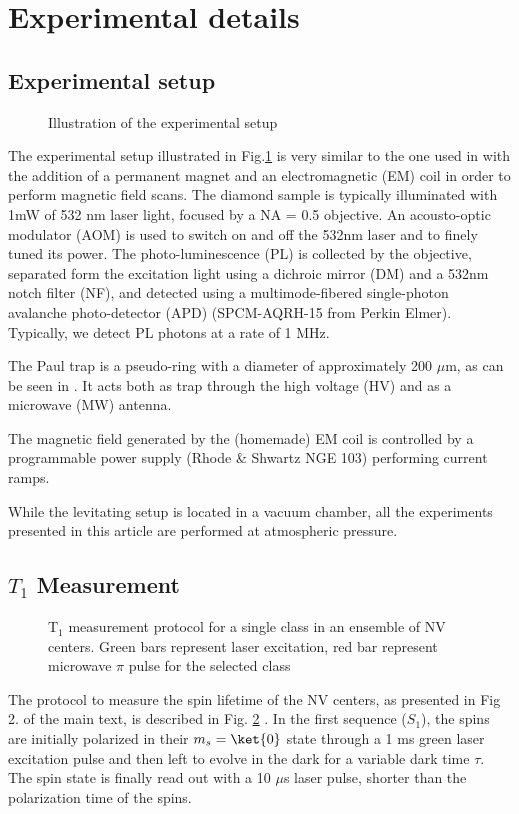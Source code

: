 \documentclass[preprintnumbers,amsmath,amssymb,onecolumn,12pt]{revtex4}
\begin{document}
\section{Experimental details}

\subsection{Experimental setup}

\begin{figure}[!ht]
  \centering {}
  \caption{Illustration of the experimental setup}
	\label{Optics}
\end{figure}

The experimental setup illustrated in Fig.\ref{Optics} is very similar to the one used in \citep{DelordPRL} with the addition of a permanent magnet and an electromagnetic (EM) coil in order to perform magnetic field scans. The diamond sample is typically illuminated with 1mW of 532 nm laser light, focused by a NA = 0.5 objective. An acousto-optic modulator (AOM) is used to switch on and off the 532nm laser and to finely tuned its power. The photo-luminescence (PL) is collected by the objective, separated form the excitation light using a dichroic mirror (DM) and a 532nm notch filter (NF), and detected using a multimode-fibered single-photon avalanche photo-detector (APD) (SPCM-AQRH-15 from Perkin Elmer). Typically, we detect PL photons at a rate of 1 MHz. 

The Paul trap is a pseudo-ring with a diameter of approximately 200 $\mu$m, as can be seen in \citep{DelordPhD}. It acts both as trap through the high voltage (HV) and as a microwave (MW) antenna.

The magnetic field generated by the (homemade) EM coil is controlled by a programmable power supply (Rhode \& Shwartz NGE 103) performing current ramps.

While the levitating setup is located in a vacuum chamber, all the experiments presented in this article are performed at atmospheric pressure.


\subsection{$T_1$ Measurement}
\begin{figure}[!ht]
  \centering {}
  \caption{T$_1$ measurement protocol for a single class in an ensemble of NV centers. Green bars represent laser excitation, red bar represent microwave $\pi$ pulse for the selected class}
	\label{T1_protocol}
\end{figure}
The protocol to measure the spin lifetime of the NV centers, as presented in Fig 2. of the main text, is described in Fig. \ref{T1_protocol} . In the first sequence ($S_1$), the spins are initially polarized in their $m_s=\ket{0}$ state through a 1 ms green laser excitation pulse and then left to evolve in the dark for a variable dark time $\tau$. The spin state is finally read out with a 10 $\mu$s laser pulse, shorter than the polarization time of the spins.
\end{document}
